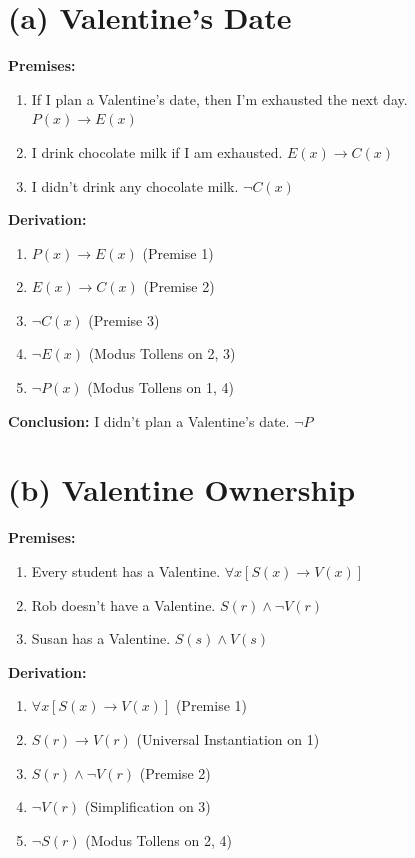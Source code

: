 \documentclass[10pt]{exam}
\begin{document}
\begin{questions}
\begin{solution}
\section*{(a) Valentine's Date}

\textbf{Premises:}
\begin{enumerate}
    \item If I plan a Valentine's date, then I'm exhausted the next day. \quad $P(x) \to E(x)$
    \item I drink chocolate milk if I am exhausted. \quad $E(x) \to C(x)$
    \item I didn't drink any chocolate milk. \quad $\neg C(x)$
\end{enumerate}

\textbf{Derivation:}
\begin{enumerate}
    \item $P(x) \to E(x)$ \quad (Premise 1)
    \item $E(x) \to C(x)$ \quad (Premise 2)
    \item $\neg C(x)$ \quad (Premise 3)
    \item $\neg E(x)$ \quad (Modus Tollens on 2, 3)
    \item $\neg P(x)$ \quad (Modus Tollens on 1, 4)
\end{enumerate}

\textbf{Conclusion:} I didn't plan a Valentine's date. \quad $\neg P$

\section*{(b) Valentine Ownership}

\textbf{Premises:}
\begin{enumerate}
    \item Every student has a Valentine. \quad $\forall x [S(x) \to V(x)]$
    \item Rob doesn't have a Valentine. \quad $S(r) \land \neg V(r)$
    \item Susan has a Valentine. \quad $S(s) \land V(s)$
\end{enumerate}

\textbf{Derivation:}
\begin{enumerate}
    \item $\forall x [S(x) \to V(x)]$ \quad (Premise 1)
    \item $S(r) \to V(r)$ \quad (Universal Instantiation on 1)
    \item $S(r) \land \neg V(r)$ \quad (Premise 2)
    \item $\neg V(r)$ \quad (Simplification on 3)
    \item $\neg S(r)$ \quad (Modus Tollens on 2, 4)
\end{enumerate}


\end{solution}
\end{questions}
\end{document}
